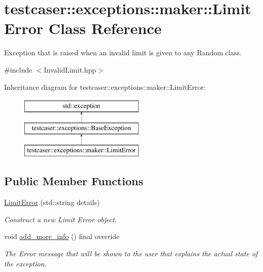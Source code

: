 \hypertarget{classtestcaser_1_1exceptions_1_1maker_1_1LimitError}{}\section{testcaser\+:\+:exceptions\+:\+:maker\+:\+:Limit\+Error Class Reference}
\label{classtestcaser_1_1exceptions_1_1maker_1_1LimitError}


Exception that is raised when an invalid limit is given to any Random class.  




{\ttfamily \#include $<$Invalid\+Limit.\+hpp$>$}

Inheritance diagram for testcaser\+:\+:exceptions\+:\+:maker\+:\+:Limit\+Error\+:\begin{figure}[H]
\begin{center}
\leavevmode
\includegraphics[height=3.000000cm]{classtestcaser_1_1exceptions_1_1maker_1_1LimitError}
\end{center}
\end{figure}
\subsection*{Public Member Functions}
\begin{DoxyCompactItemize}
\item 
\hyperlink{classtestcaser_1_1exceptions_1_1maker_1_1LimitError_a93442165f498e8910b4c2170a05d3b3a}{Limit\+Error} (std\+::string details)
\begin{DoxyCompactList}\small\item\em Construct a new Limit Error object. \end{DoxyCompactList}\item 
\mbox{\label{classtestcaser_1_1exceptions_1_1maker_1_1LimitError_adb0f0c92f0d78b26f4310301f97bff3a}} 
void \hyperlink{classtestcaser_1_1exceptions_1_1maker_1_1LimitError_adb0f0c92f0d78b26f4310301f97bff3a}{add\+\_\+more\+\_\+info} () final override
\begin{DoxyCompactList}\small\item\em The Error message that will be shown to the user that explains the actual state of the exception. \end{DoxyCompactList}\end{DoxyCompactItemize}

